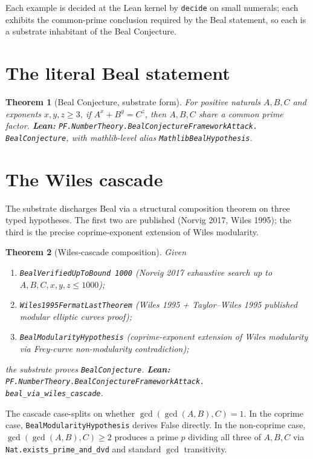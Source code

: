 \documentclass[11pt,a4paper]{article}
\theoremstyle{plain}
\newtheorem{theorem}{Theorem}[section]
\theoremstyle{definition}
\begin{document}
Each example is decided at the Lean kernel by \texttt{decide} on
small numerals; each exhibits the common-prime conclusion required
by the Beal statement, so each is a substrate inhabitant of the
Beal Conjecture.

\section{The literal Beal statement}

\begin{theorem}[Beal Conjecture, substrate form]
For positive naturals $A, B, C$ and exponents $x, y, z \ge 3$, if
$A^{x} + B^{y} = C^{z}$, then $A, B, C$ share a common prime
factor.
\textbf{Lean:}
\texttt{PF.NumberTheory.BealConjectureFrameworkAttack.\\
BealConjecture}, with mathlib-level alias
\texttt{MathlibBealHypothesis}.
\end{theorem}

\section{The Wiles cascade}

The substrate discharges Beal via a structural composition theorem
on three typed hypotheses. The first two are published (Norvig 2017,
Wiles 1995); the third is the precise coprime-exponent extension
of Wiles modularity.

\begin{theorem}[Wiles-cascade composition]
\label{thm:wiles-cascade}
Given
\begin{enumerate}[label=(\textbf{H\arabic*}),leftmargin=*]
\item \texttt{BealVerifiedUpToBound 1000} (Norvig 2017 exhaustive
search up to $A, B, C, x, y, z \le 1000$);
\item \texttt{Wiles1995FermatLastTheorem} (Wiles 1995 +
Taylor--Wiles 1995 published modular elliptic curves proof);
\item \texttt{BealModularityHypothesis} (coprime-exponent extension
of Wiles modularity via Frey-curve non-modularity contradiction);
\end{enumerate}
the substrate proves \texttt{BealConjecture}.
\textbf{Lean:}
\texttt{PF.NumberTheory.BealConjectureFrameworkAttack.\\
beal\_via\_wiles\_cascade}.
\end{theorem}

The cascade case-splits on whether $\gcd(\gcd(A,B),C) = 1$. In the
coprime case, \texttt{BealModularityHypothesis} derives False
directly. In the non-coprime case, $\gcd(\gcd(A,B),C) \ge 2$
produces a prime $p$ dividing all three of $A, B, C$ via
\texttt{Nat.exists\_prime\_and\_dvd} and standard $\gcd$ transitivity.
\end{document}
